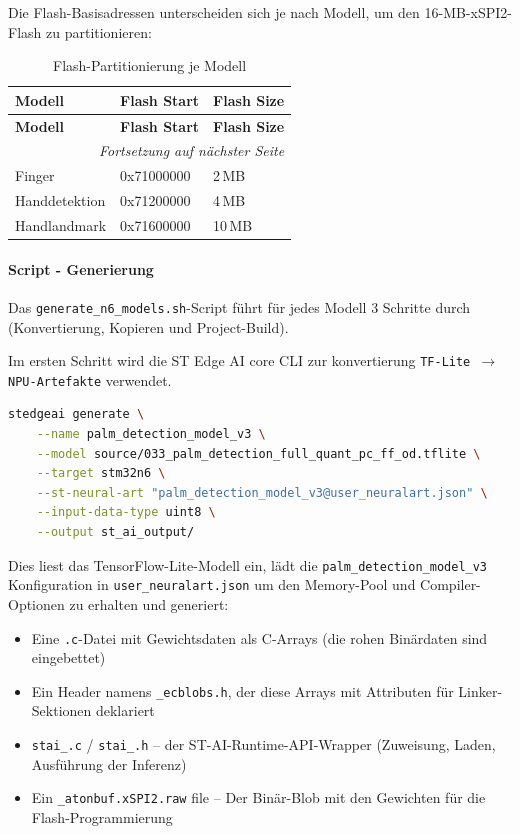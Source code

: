 Die Flash-Basisadressen unterscheiden sich je nach Modell, um den 16-MB-xSPI2-Flash zu partitionieren:

\begin{longtable}{|l|l|l|}
    \caption{Flash-Partitionierung je Modell}
    \label{tab:flash-partitionierung} \\
    \hline
    \textbf{Modell} & \textbf{Flash Start} & \textbf{Flash Size} \\
    \hline
    \endfirsthead
    \hline
    \textbf{Modell} & \textbf{Flash Start} & \textbf{Flash Size} \\
    \hline
    \endhead
    \hline
    \multicolumn{3}{r}{\textit{Fortsetzung auf nächster Seite}} \\
    \endfoot
    \hline
    \endlastfoot
    Finger & 0x71000000 & 2\,MB \\
    \hline
    Handdetektion & 0x71200000 & 4\,MB \\
    \hline
    Handlandmark & 0x71600000 & 10\,MB \\
    \hline
\end{longtable}

\paragraph{Script - Generierung}
Das \texttt{generate\_n6\_models.sh}-Script führt für jedes Modell 3 Schritte durch (Konvertierung, Kopieren und Project-Build).

Im ersten Schritt wird die ST Edge AI core CLI zur konvertierung \texttt{TF-Lite $\rightarrow$ NPU-Artefakte} verwendet.

\begin{lstlisting}[language=bash, caption={STedgeAI Modellgenerierung}, label={lst:stedgeai-generate}]
stedgeai generate \
    --name palm_detection_model_v3 \
    --model source/033_palm_detection_full_quant_pc_ff_od.tflite \
    --target stm32n6 \
    --st-neural-art "palm_detection_model_v3@user_neuralart.json" \
    --input-data-type uint8 \
    --output st_ai_output/
\end{lstlisting}

Dies liest das TensorFlow-Lite-Modell ein, lädt die \texttt{palm\_detection\_model\_v3} Konfiguration in \texttt{user\_neuralart.json} um den Memory-Pool und Compiler-Optionen zu erhalten und generiert:
\begin{itemize}
    \item Eine \texttt{.c}-Datei mit Gewichtsdaten als C-Arrays (die rohen Binärdaten sind eingebettet)
    \item Ein Header namens \texttt{\_ecblobs.h}, der diese Arrays mit Attributen für Linker-Sektionen deklariert
    \item \texttt{stai\_\*.c} / \texttt{stai\_\*.h} -- der ST-AI-Runtime-API-Wrapper (Zuweisung, Laden, Ausführung der Inferenz)
    \item Ein \texttt{\*\_atonbuf.xSPI2.raw} file -- Der Binär-Blob mit den Gewichten für die Flash-Programmierung
\end{itemize}

